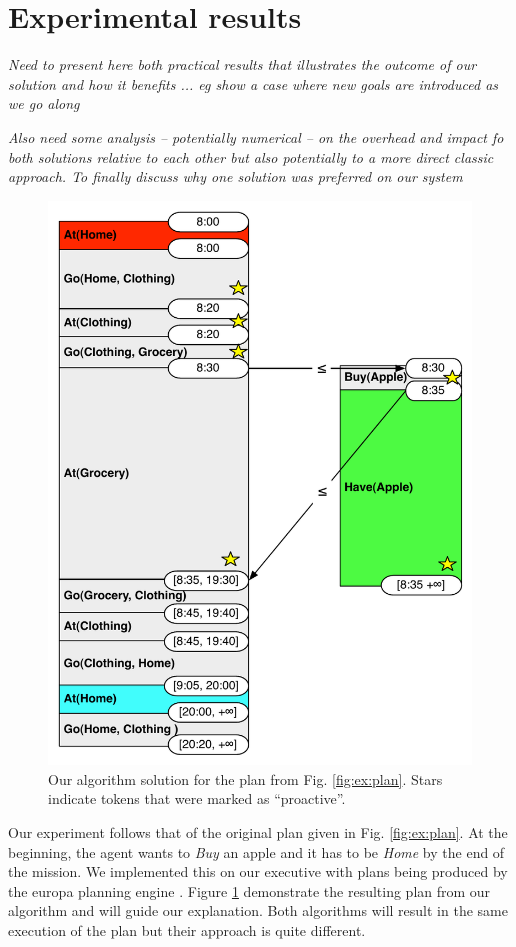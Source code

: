 
\section{Experimental results}
\label{sec:exp}

{\em\color{gray} Need to present here both practical results that illustrates the outcome of our solution and how it benefits ... eg show a case where new goals are introduced as we go along}

{\em\color{gray} Also need some analysis -- potentially numerical -- on the overhead and impact fo both solutions relative to each other but also potentially to a more direct classic approach. 
To finally discuss why one solution was preferred on our system} 

\begin{figure}
  \centering
  \includegraphics[width=0.8\columnwidth]{figs/example_MixedInitial}
  \caption{Our algorithm solution for the plan from
    Fig. \ref{fig:ex:plan}. Stars indicate tokens that were marked
  as ``proactive''.}
  \label{fig:ex:mixed1}
\end{figure}

Our experiment follows that of the original plan given in
Fig. \ref{fig:ex:plan}. At the beginning, the agent wants to {\em Buy}
an apple and it has to be {\em Home} by the end of the mission. We
implemented this on our executive with plans being produced by the
europa planning engine \cite{frank2003}. Figure \ref{fig:ex:mixed1}
demonstrate the resulting plan from our algorithm and will guide our
explanation. Both algorithms will result in the same execution of the
plan but their approach is quite different.

